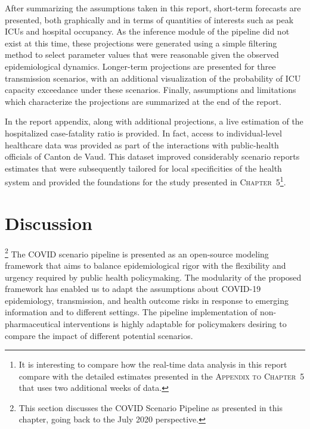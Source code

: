 {After summarizing the assumptions taken in this report, short-term forecasts are presented, both graphically and in terms of quantities of interests such as peak ICUs and hospital occupancy. As the inference module of the pipeline did not exist at this time, these projections were generated using a simple filtering method to select parameter values that were reasonable given the observed epidemiological dynamics.  Longer-term projections are presented for three transmission scenarios, with an additional visualization of the probability of ICU capacity exceedance under these scenarios. Finally, assumptions and limitations which characterize the projections are summarized at the end of the report. 

In the report appendix, along with additional projections, a live estimation of the hospitalized case-fatality ratio is provided. In fact, access to individual-level healthcare data was provided as part of the interactions with public-health officials of Canton de Vaud.  This dataset improved considerably scenario reports estimates that were subsequently tailored for local specificities of the health system and provided the foundations for the study presented in \textsc{Chapter~5}\footnote[][-3\baselineskip]{It is interesting to compare how the real-time data analysis in this report compare with the detailed estimates presented in the \textsc{Appendix to Chapter~5} that uses two additional weeks of data.}.


 


\section{Discussion}\footnote{This section discusses the COVID Scenario Pipeline as presented in this chapter, \ie going back to the July 2020 perspective.}
The COVID scenario pipeline is presented as an open-source modeling framework that aims to balance epidemiological rigor with the flexibility and urgency required by public health policymaking. The modularity of the proposed framework has enabled us to adapt the assumptions about COVID-19 epidemiology, transmission, and health outcome risks in response to emerging information and to different settings. The pipeline implementation of non-pharmaceutical interventions is highly adaptable for policymakers desiring to compare the impact of different potential scenarios.

}
